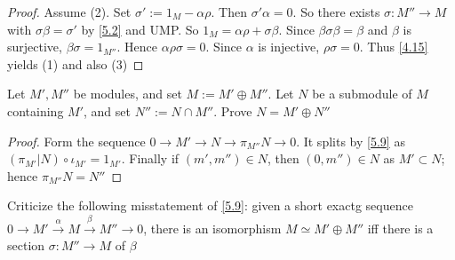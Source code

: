 \documentclass[11pt]{article}
\begin{document}
\begin{proof}
Assume (2). Set \(\sigma':=1_M-\alpha\rho\). Then \(\sigma'\alpha=0\). So
there exists \(\sigma:M''\to M\) with \(\sigma\beta=\sigma'\) by \ref{5.2} and UMP.
So \(1_M=\alpha\rho+\sigma\beta\). Since \(\beta\sigma\beta=\beta\) and \(\beta\) is
surjective, \(\beta\sigma=1_{M''}\). Hence \(\alpha\rho\sigma=0\). Since \(\alpha\) is
injective, \(\rho\sigma=0\). Thus \ref{4.15} yields (1) and also (3)
\end{proof}

\begin{exercise}
\label{5.10}
Let \(M',M''\) be modules, and set \(M:=M'\oplus M''\). Let \(N\) be a
submodule of \(M\) containing \(M'\), and set \(N'':=N\cap M''\). Prove
\(N=M'\oplus N''\)
\end{exercise}

\begin{proof}
Form the sequence \(0\to M'\to N\to\pi_{M''}N\to0\). It splits by \ref{5.9}  as
\((\pi_{M'}|N)\circ\iota_{M'}=1_{M'}\). Finally if \((m',m'')\in N\), then
\((0,m'')\in N\) as \(M'\subset N\); hence \(\pi_{M''}N=N''\)
\end{proof}

\begin{exercise}
\label{5.11} Criticize the following misstatement of \ref{5.9}: given a short
exactg sequence \(0\to M'\xrightarrow{\alpha}M\xrightarrow{\beta}M''\to0\), there is
an isomorphism \(M\simeq M'\oplus M''\) iff there is a section \(\sigma:M''\to M\)
of \(\beta\)
\end{exercise}
\end{document}
